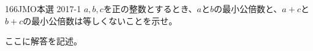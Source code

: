 \begin{thm}{166}{}{JMO本選 2017-1}
 $a, b, c$を正の整数とするとき、$a$と$b$の最小公倍数と、$a+c$と$b+c$の最小公倍数は等しくないことを示せ。
\end{thm}

ここに解答を記述。
